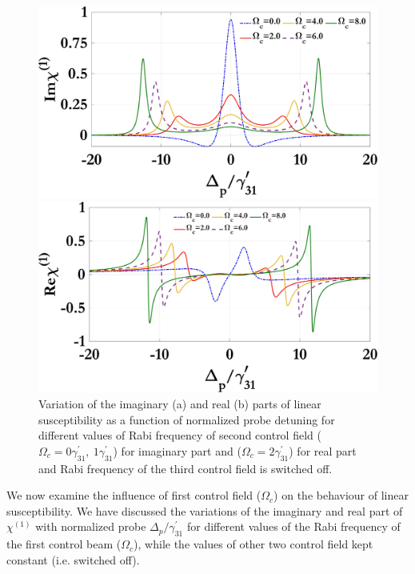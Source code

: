 \documentclass[12pt,a4paper]{article}
\begin{document}
\begin{figure}[ht]
  \centering
  \begin{minipage}{0.48\textwidth}
    \centering
    \includegraphics[width=\linewidth]{Plots/Img_chi1_Omega_c.jpeg}
    \subcaption{}
  \end{minipage}%
  \hfill
  \begin{minipage}{0.48\textwidth}
    \centering
    \includegraphics[width=\linewidth]{Plots/Real_chi1_Omega_c.jpeg}
    \subcaption{}
  \end{minipage}
  \caption{Variation of the imaginary (a) and real (b) parts of linear susceptibility as a function of normalized probe detuning for different values of Rabi frequency of second control field ($\Omega_c=0\gamma^{\prime}_{31},\ 1\gamma^{\prime}_{31}$) for imaginary part and ($\Omega_c=2\gamma^{\prime}_{31}$) for real part and Rabi frequency of the third control field is switched off.}
  \label{fig:omegac}
\end{figure}

We now examine the influence of first control field ($\Omega_{c}$) on the behaviour of linear susceptibility. We have discussed the variations of the imaginary and real part of $\chi^{(1)}$ with normalized probe $\Delta_{p}/\gamma^{\prime}_{31}$ for different values of the Rabi frequency of the first control beam ($\Omega_c$), while the values of other two control field kept constant (i.e. switched off).
\end{document}
